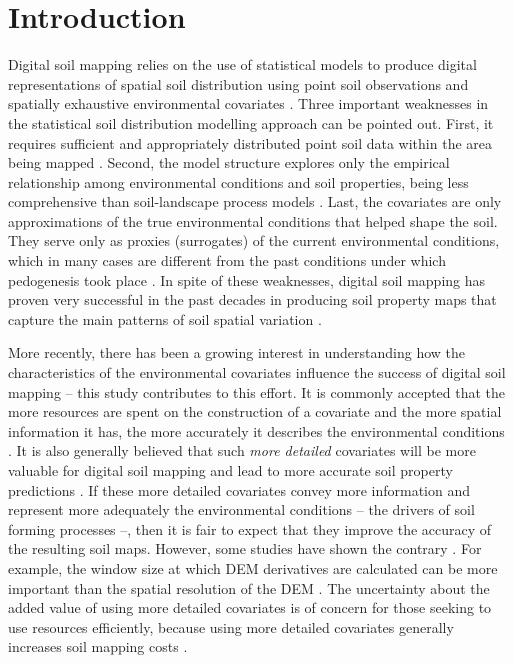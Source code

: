 \formatchapter

\section{Introduction}
\label{sec:intro}

Digital soil mapping relies on the use of statistical models to produce digital
representations of spatial soil distribution using point soil observations and 
spatially exhaustive environmental covariates \citep{McBratneyEtAl2003, 
ScullEtAl2003, Florinsky2012}. Three important weaknesses in the statistical 
soil distribution modelling approach can be pointed out. First, it requires 
sufficient and appropriately distributed point soil data within the area being 
mapped \citep{CarreEtAl2007a}. Second, the model structure explores only the 
empirical relationship among environmental conditions and soil properties, being
less comprehensive than soil-landscape process models \citep{Grunwald2009}. 
Last, the covariates are only approximations of the true environmental 
conditions that helped shape the soil. They serve only as proxies (surrogates) 
of the current environmental conditions, which in many cases are different from
the past conditions under which pedogenesis took place \citep{HeuvelinkEtAl2001}.
In spite of these weaknesses, digital soil mapping has proven very successful 
in the past decades in producing soil property maps that capture the main 
patterns of soil spatial variation 
\citep{MooreEtAl1993, McBratneyEtAl2000, Grunwald2009}.

More recently, there has been a growing interest in understanding how the 
characteristics of the environmental covariates influence the success of digital
soil mapping -- this study contributes to this effort. It is commonly accepted 
that the more resources are spent on the construction of a covariate and the 
more spatial information it has, the more accurately it describes the 
environmental conditions \citep{HupyEtAl2004, HenglEtAl2013a}. It is also 
generally believed that such \textit{more detailed} covariates will be more 
valuable for digital soil mapping and lead to more accurate soil property 
predictions \citep{CavazziEtAl2013, MaynardEtAl2014}. If these more detailed 
covariates convey more information and represent more adequately the 
environmental conditions -- the drivers of soil forming processes --, then it 
is fair to expect that they improve the accuracy of the resulting soil maps. 
However, some studies have shown the contrary 
\citep{ThompsonEtAl2001, EldeiryEtAl2008, KimEtAl2014}. For example, the window
size at which DEM derivatives are calculated can be more important than the 
spatial resolution of the DEM \citep{Wood1996, ZhuEtAl2008, BehrensEtAl2010a}. 
The uncertainty about the added value of using more detailed covariates is of 
concern for those seeking to use resources efficiently, because using more 
detailed covariates generally increases soil mapping costs \citep{ShiEtAl2012}.

